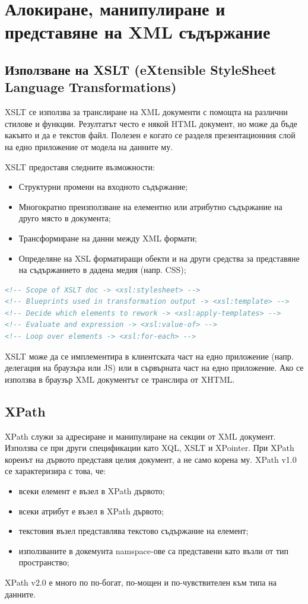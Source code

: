 \documentclass[fleqn,12pt]{article}
\begin{document}
\section{Алокиране, манипулиране и представяне на XML съдържание}

\subsection{Използване на XSLT (eXtensible StyleSheet Language Transformations)}

XSLT се използва за транслиране на XML документи с помощта на различни стилове и функции.
Резултатът често е някой HTML документ, но може да бъде какъвто и да е текстов файл.
Полезен е когато се разделя презентационния слой на едно приложение от модела на данните му.

XSLT предоставя следните възможности:
\begin{itemize}
    \item Структурни промени на входното съдържание;
    \item Многократно преизползване на елементно или атрибутно съдържание на друго място в документа;
    \item Трансформиране на данни между XML формати;
    \item Определяне на XSL форматиращи обекти и на други средства за представяне на съдържанието в дадена медия (напр. CSS);
\end{itemize}

\begin{lstlisting}[language=XML, caption=XSLT elements]
<!-- Scope of XSLT doc -> <xsl:stylesheet> -->
<!-- Blueprints used in transformation output -> <xsl:template> -->
<!-- Decide which elements to rework -> <xsl:apply-templates> -->
<!-- Evaluate and expression -> <xsl:value-of> -->
<!-- Loop over elements -> <xsl:for-each> -->
\end{lstlisting}

XSLT може да се имплементира в клиентската част на едно приложение (напр. делегация на браузъра или JS) или в сървърната част на едно приложение.
Ако се използва в браузър XML документът се транслира от XHTML.

\subsection{XPath}

XPath служи за адресиране и манипулиране на секции от XML документ.
Използва се при други спецификации като XQL, XSLT и XPointer.
\bigbreak
При XPath коренът на дървото представя целия документ, а не само корена му.
XPath v1.0 се характеризира с това, че:
\begin{itemize}
    \item всеки елемент е възел в XPath дървото;
    \item всеки атрибут е възел в XPath дървото;
    \item текстовия възел представлява текстово съдържание на елемент;
    \item използваните в докемунта namspace-ове са представени като възли от тип пространство;
\end{itemize}
XPath v2.0 е много по по-богат, по-мощен и по-чувствителен към типа на данните.
\end{document}
